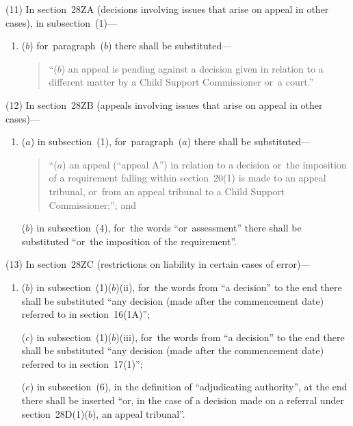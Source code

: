 \documentclass[12pt,a4paper]{article}
\begin{document}
(11) In section~28ZA (decisions involving issues that arise on appeal in other cases), in subsection~(1)—
\begin{enumerate}\item[]

($b$) for~paragraph~($b$)  there shall be substituted—

\begin{quotation}
“($b$) an appeal is pending against a decision given in relation to a different matter by a Child Support Commissioner or~a court.”
\end{quotation}
\end{enumerate}

(12) In section~28ZB (appeals involving issues that arise on appeal in other cases)—
\begin{enumerate}\item[]
($a$) in subsection~(1), for~paragraph~($a$)  there shall be substituted—
\begin{quotation}
“($a$) an appeal (“appeal A”) in relation to a decision or~the imposition of a requirement falling within section~20(1)  is made to an appeal tribunal, or~from an appeal tribunal to a Child Support Commissioner;”; and
\end{quotation}

($b$) in subsection~(4), for~the words “or~assessment” there shall be substituted “or~the imposition of the requirement”.
\end{enumerate}

(13) In section~28ZC (restrictions on liability in certain cases of error)—
\begin{enumerate}\item[]

($b$) in subsection~(1)($b$)(ii), for~the words from “a decision” to the end there shall be substituted “any decision (made after the commencement date) referred to in section~16(1A)”;

($c$) in subsection~(1)($b$)(iii), for~the words from “a decision” to the end there shall be substituted “any decision (made after the commencement date) referred to in section~17(1)”;


($e$) in subsection~(6), in the definition of “adjudicating authority”, at the end there shall be inserted “or, in the case of a decision made on a referral under section~28D(1)($b$), an appeal tribunal”.
\end{enumerate}
\end{document}
